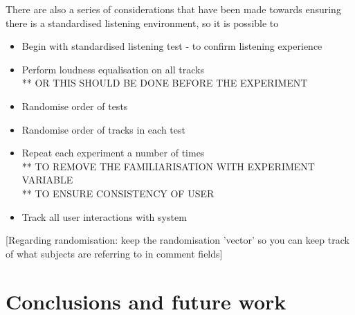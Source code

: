 \documentclass{article}
\begin{document}


There are also a series of considerations that have been made towards ensuring there is a standardised listening environment, so it is possible to
\begin{itemize}
\item Begin with standardised listening test - to confirm listening experience
\item Perform loudness equalisation on all tracks 
\\** OR THIS SHOULD BE DONE BEFORE THE EXPERIMENT
\item Randomise order of tests
\item Randomise order of tracks in each test
\item Repeat each experiment a number of times 
\\** TO REMOVE THE FAMILIARISATION WITH EXPERIMENT VARIABLE 
\\** TO ENSURE CONSISTENCY OF USER
\item Track all user interactions with system
\end{itemize}



[Regarding randomisation: keep the randomisation 'vector' so you can keep track of what subjects are referring to in comment fields]


\section{Conclusions and future work}\label{sec:conclusions}
\end{document}
